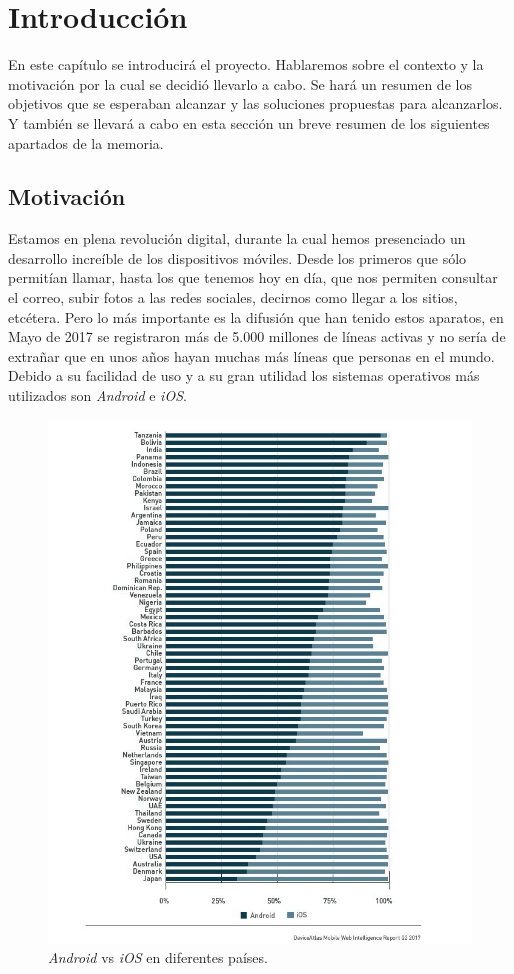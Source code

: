\chapter{Introducción}
En este capítulo se introducirá el proyecto. Hablaremos sobre el contexto y la motivación por la cual se decidió llevarlo a cabo. Se hará un resumen de los objetivos que se esperaban alcanzar y las soluciones propuestas para alcanzarlos. Y también se llevará a cabo en esta sección un breve resumen de los siguientes apartados de la memoria.

\section{Motivación}

Estamos en plena revolución digital, durante la cual hemos presenciado un desarrollo increíble de los dispositivos móviles. Desde los primeros que sólo permitían llamar, hasta los que tenemos hoy en día, que nos permiten consultar el correo, subir fotos a las redes sociales, decirnos como llegar a los sitios, etcétera. Pero lo más importante es la difusión que han tenido estos aparatos, en Mayo de 2017 se registraron más de 5.000 millones de líneas activas y no sería de extrañar que en unos años hayan muchas más líneas que personas en el mundo. Debido a su facilidad de uso y a su gran utilidad los sistemas operativos más utilizados son \textit{Android} e \textit{iOS}.

\begin{figure}[t] 
\begin{center}
\includegraphics[scale=0.6]{figures/ios_android.jpg}
\caption{\textit{Android} vs \textit{iOS} en diferentes países.\label{fig:and_vs_ios}}
\end{center}
\end{figure}

